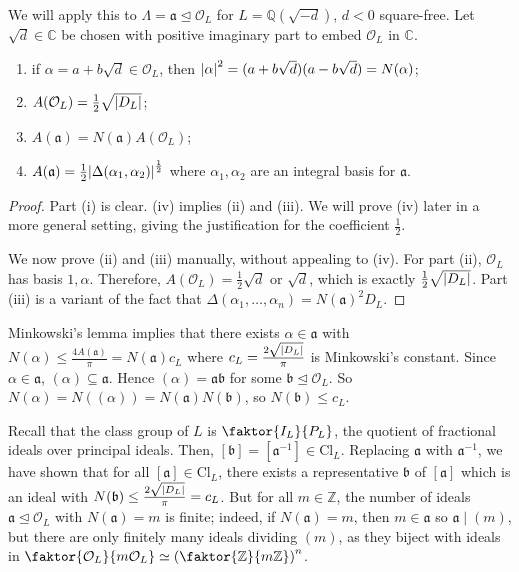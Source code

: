 We will apply this to \( \Lambda = \mathfrak a \trianglelefteq \mathcal O_L \) for \( L = \mathbb Q(\sqrt{-d}) \), \( d < 0 \) square-free.
Let \( \sqrt{d} \in \mathbb C \) be chosen with positive imaginary part to embed \( \mathcal O_L \) in \( \mathbb C \).
\begin{lemma}
    \begin{enumerate}
        \item if \( \alpha = a + b \sqrt{d} \in \mathcal O_L \), then \( \abs{\alpha}^2 = (a+b\sqrt{d})(a-b\sqrt{d}) = N(\alpha) \);
        \item \( A(\mathcal O_L) = \frac{1}{2}\sqrt{\abs{D_L}} \);
        \item \( A(\mathfrak a) = N(\mathfrak a) A(\mathcal O_L) \);
        \item \( A(\mathfrak a) = \frac{1}{2} \abs{\Delta(\alpha_1, \alpha_2)}^{\frac{1}{2}} \) where \( \alpha_1, \alpha_2 \) are an integral basis for \( \mathfrak a \).
    \end{enumerate}
\end{lemma}
\begin{proof}
    Part (i) is clear.
    (iv) implies (ii) and (iii).
    We will prove (iv) later in a more general setting, giving the justification for the coefficient \( \frac{1}{2} \).

    We now prove (ii) and (iii) manually, without appealing to (iv).
    For part (ii), \( \mathcal O_L \) has basis \( 1, \alpha \).
    Therefore, \( A(\mathcal O_L) = \frac{1}{2}\sqrt{d} \) or \( \sqrt{d} \), which is exactly \( \frac{1}{2} \sqrt{\abs{D_L}} \).
    Part (iii) is a variant of the fact that \( \Delta(\alpha_1, \dots, \alpha_n) = N(\mathfrak a)^2 D_L \).
\end{proof}
Minkowski's lemma implies that there exists \( \alpha \in \mathfrak a \) with \( N(\alpha) \leq \frac{4A(\mathfrak a)}{\pi} = N(\mathfrak a) c_L \) where \( c_L = \frac{2\sqrt{\abs{D_L}}}{\pi} \) is Minkowski's constant.
Since \( \alpha \in \mathfrak a \), \( (\alpha) \subseteq \mathfrak a \).
Hence \( (\alpha) = \mathfrak a \mathfrak b \) for some \( \mathfrak b \trianglelefteq \mathcal O_L \).
So \( N(\alpha) = N((\alpha)) = N(\mathfrak a) N(\mathfrak b) \), so \( N(\mathfrak b) \leq c_L \).

Recall that the class group of \( L \) is \( \faktor{I_L}{P_L} \), the quotient of fractional ideals over principal ideals.
Then, \( [\mathfrak b] = [\mathfrak a^{-1}] \in \mathrm{Cl}_L \).
Replacing \( \mathfrak a \) with \( \mathfrak a^{-1} \), we have shown that for all \( [\mathfrak a] \in \mathrm{Cl}_L \), there exists a representative \( \mathfrak b \) of \( [\mathfrak a] \) which is an ideal with \( N(\mathfrak b) \leq \frac{2\sqrt{\abs{D_L}}}{\pi} = c_L \).
But for all \( m \in \mathbb Z \), the number of ideals \( \mathfrak a \trianglelefteq \mathcal O_L \) with \( N(\mathfrak a) = m \) is finite; indeed, if \( N(\mathfrak a) = m \), then \( m \in \mathfrak a \) so \( \mathfrak a \mid (m) \), but there are only finitely many ideals dividing \( (m) \), as they biject with ideals in \( \faktor{\mathcal O_L}{m\mathcal O_L} \simeq \qty(\faktor{\mathbb Z}{m\mathbb Z})^n \).

